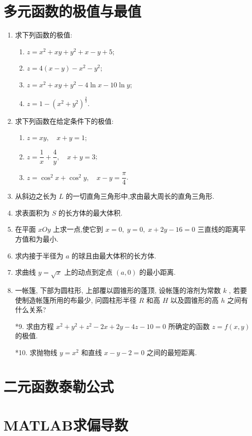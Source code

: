 \section{多元函数的极值与最值}

\begin{enumerate}\setlength{\itemsep}{7pt}
    \item 求下列函数的极值:
    \begin{enumerate}[(1)]\setlength{\itemsep}{5pt}\setlength{\topsep}{15pt}
        \item $z=x^2+xy+y^2+x-y+5$;
        \item $z=4(x-y)-x^2-y^2$;
        \item $z=x^2+xy+y^2-4\ln x-10\ln y$;
        \item $z=1-(x^2+y^2)^{\frac{2}{3}}$.
    \end{enumerate}

    \item 求下列函数在给定条件下的极值:
    \begin{enumerate}[(1)]\setlength{\itemsep}{5pt}\setlength{\topsep}{15pt}
        \item $z=xy,\quad x+y=1$;
        \item $z=\dfrac{1}{x}+\dfrac{4}{y},\quad x+y=3$;
        \item $z=\cos^2x+\cos^2y,\quad x-y=\dfrac{\pi}{4}$.
    \end{enumerate}

    \item 从斜边之长为 $L$ 的一切直角三角形中,求由最大周长的直角三角形.
    
    \item 求表面积为 $S$ 的长方体的最大体积.
    
    \item 在平面 $xOy$ 上求一点,使它到 $x=0,\;y=0,\;x+2y-16=0$ 三直线的距离平方值和为最小.
    
    \item 求内接于半径为 $a$ 的球且由最大体积的长方体.
    
    \item 求曲线 $y=\sqrt{x}$ 上的动点到定点 $(a, 0)$ 的最小距离.
    
    \item 一帐篷, 下部为圆柱形, 上部覆以圆锥形的蓬顶, 设帐篷的溶剂为常数 $k$ , 若要使制造帐篷所用的布最少, 问圆柱形半径 $R$ 和高 $H$ 以及圆锥形的高 $h$ 之间有什么关系?
    
    \item[*9.] 求由方程 $x^2+y^2+z^2-2x+2y-4z-10=0$ 所确定的函数 $z=f(x, y)$ 的极值.
    
    \item[*10.] 求抛物线 $y=x^2$ 和直线 $x-y-2=0$ 之间的最短距离. 
\end{enumerate}

\section{二元函数泰勒公式}


\section{MATLAB求偏导数}